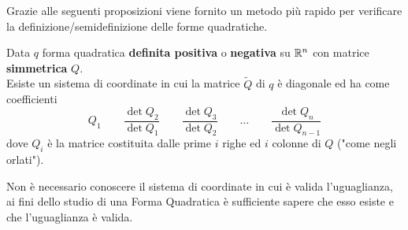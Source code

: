 \begin{appendices}
\vspace*{\baselineskip}
Grazie alle seguenti proposizioni viene fornito un metodo più rapido per verificare la definizione/semidefinizione delle forme quadratiche.
\begin{proposition}
	\label{prop:gram_schm}
	Data $q$ forma quadratica \textbf{definita positiva} o \textbf{negativa} su $\mathbb{R}^n$ con matrice \textbf{simmetrica} $Q$.\\
	Esiste un sistema di coordinate in cui la matrice $\tilde{Q}$ di $q$ è diagonale ed ha come coefficienti
	\[Q_1 \qquad \frac{\det Q_2}{\det Q_1} \qquad \frac{\det Q_3}{\det Q_2} \qquad \dotsc \qquad \frac{\det Q_n}{\det Q_{n-1}}\]
	dove $Q_i$ è la matrice costituita dalle prime $i$ righe ed $i$ colonne di $Q$ ("come negli orlati").
	\begin{note}
		Non è necessario conoscere il sistema di coordinate in cui è valida l'uguaglianza, ai fini dello studio di
		una Forma Quadratica è sufficiente sapere che esso esiste e che l'uguaglianza è valida.
	\end{note}
	\begin{center}
\end{center}
\end{proposition}
\end{appendices}
